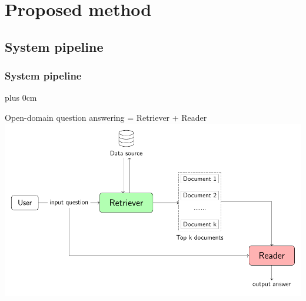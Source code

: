 \documentclass[11pt]{beamer}
\renewcommand{\raggedright}{\leftskip=0pt \rightskip=0pt plus 0cm}
\let\olditemize=\itemize
\renewenvironment{itemize}{\olditemize\raggedright}{\endlist}
\begin{document}
\section{Proposed method}
\subsection{System pipeline}
\begin{frame}
\frametitle{System pipeline}
\begin{itemize}
	\item Open-domain question answering = Retriever + Reader
\end{itemize}
\hspace*{-15pt}
\includegraphics[scale=.68]{images/PDF/overall_arch/architecture.pdf}
\end{frame}
\end{document}
